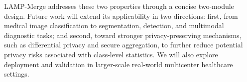 \documentclass[letterpaper]{article} %
\begin{document}
LAMP-Merge addresses these two properties through a concise two-module design. Future work will extend its applicability in two directions: first, from medical image classification to segmentation, detection, and multimodal diagnostic tasks; and second, toward stronger privacy-preserving mechanisms, such as differential privacy and secure aggregation, to further reduce potential privacy risks associated with class-level statistics. We will also explore deployment and validation in larger-scale real-world multicenter healthcare settings.



\end{document}

